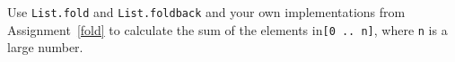 Use \lstinline{List.fold} and \lstinline{List.foldback} and your own implementations from Assignment~\ref{fold} to calculate the sum of the elements in\lstinline{[0 .. n]}, where \lstinline{n} is a large number.
